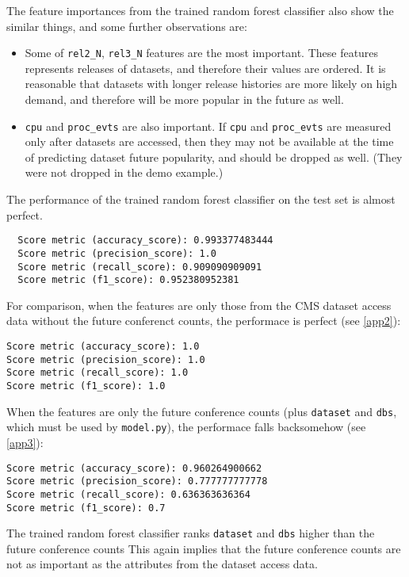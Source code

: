 \documentclass[final, 12pt]{elsarticle}
\begin{document}
The feature importances from the trained random forest classifier also show the similar things, and some further observations are:

\begin{itemize}
  
\item   
Some of \verb|rel2_N|, \verb|rel3_N| features are the most important.
These features represents releases of datasets, and therefore their values are ordered.
It is reasonable that datasets with longer release histories are more likely on high demand, and therefore will be more popular in the future as well.

\item
\verb|cpu| and \verb|proc_evts| are also important.
If \verb|cpu| and \verb|proc_evts| are measured only after datasets are accessed, then they may not be available at the time of predicting dataset future popularity, and should be dropped as well. (They were not dropped in the demo example.)

\end{itemize}


The performance of the trained random forest classifier on the test set is almost perfect.
\begin{verbatim}
  Score metric (accuracy_score): 0.993377483444
  Score metric (precision_score): 1.0
  Score metric (recall_score): 0.909090909091
  Score metric (f1_score): 0.952380952381
\end{verbatim}


For comparison, when the features are only those from the CMS dataset access data without the future conferenct counts, the performace is perfect (see  \ref{app2}):
\begin{verbatim}
Score metric (accuracy_score): 1.0
Score metric (precision_score): 1.0
Score metric (recall_score): 1.0
Score metric (f1_score): 1.0
\end{verbatim}


When the features are only the future conference counts (plus \verb|dataset| and \verb|dbs|, which must be used by \verb|model.py|), the performace falls backsomehow (see \ref{app3}):
\begin{verbatim}
Score metric (accuracy_score): 0.960264900662
Score metric (precision_score): 0.777777777778
Score metric (recall_score): 0.636363636364
Score metric (f1_score): 0.7
\end{verbatim}
The trained random forest classifier ranks \verb|dataset| and \verb|dbs| higher than the future conference counts
This again implies that the future conference counts are not as important as the attributes from the dataset access data.
\end{document}
